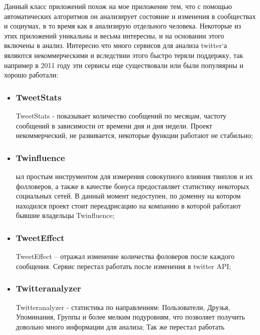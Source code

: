 \begin{chap1}
Данный класс приложений похож на мое приложение тем, что с помощью автоматических алгоритмов  он анализирует состояние и изменения в сообществах и социумах, в то время как я анализирую отдельного человека. Некоторые из этих приложений уникальны и весьма интересны, и на основании этого включены в анализ. Интересно что много сервисов для анализа twitter`а являются некоммерческими и вследствии этого быстро теряли поддержку, так например в 2011 году эти сервисы еще существовали или были популяярны и хорошо работали:
\begin{itemize}
\item \subsubsection{TweetStats}
TweetStats - показывает количество сообщений по месяцам, частоту сообщений в зависимости от времени дня и дня недели. Проект некоммерческий, не развивается, некоторые функции работают не стабильно;
\item \subsubsection{Twinfluence}
ыл простым инструментом для измерения совокупного влияния твиплов и их фолловеров, а также в качестве бонуса предоставляет статистику некоторых социальных сетей. В данный момент недоступен, по доменну на котором находился проект стоит переадрисацию на компанию в которой работают бывшие владельцы Twinfluence;
\item \subsubsection{TweetEffect}
TweetEffect – отражал изменение количества фоловеров после каждого сообщения. Сервис перестал работать после изменения в twitter API;
\item \subsubsection{Twitteranalyzer}
Twitteranalyzer - статистика по  направлениям: Пользователи, Друзья, Упоминания, Группы и более мелким подуровням, что позволяет получить довольно много информации для анализа; Так же перестал работать



\end{itemize}
\end{chap1}

